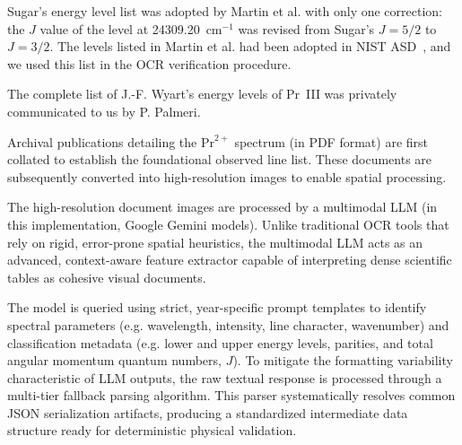 \documentclass[10pt]{article}
\begin{document}
Sugar's energy level list was adopted by Martin et al. with only one correction: the $J$ value of the level at 24309.20~cm$^{-1}$ was revised from Sugar's $J=5/2$ to $J=3/2$. The levels listed in Martin et al. had been adopted in NIST ASD~\cite{NIST_ASD}, and we used this list in the OCR verification procedure.

The complete list of J.-F. Wyart's energy levels of Pr~III was privately communicated to us by P. Palmeri.~\cite{Wyart_unpub}

Archival publications detailing the $\text{Pr}^{2+}$ spectrum (in PDF format) are first collated to establish the foundational observed line list. These documents are subsequently converted into high-resolution images to enable spatial processing.

The high-resolution document images are processed by a multimodal LLM (in this implementation, Google Gemini models). Unlike traditional OCR tools that rely on rigid, error-prone spatial heuristics, the multimodal LLM acts as an advanced, context-aware feature extractor capable of interpreting dense scientific tables as cohesive visual documents.

The model is queried using strict, year-specific prompt templates to identify spectral parameters (e.g. wavelength, intensity, line character, wavenumber) and classification metadata (e.g. lower and upper energy levels, parities, and total angular momentum quantum numbers, $J$). To mitigate the formatting variability characteristic of LLM outputs, the raw textual response is processed through a multi-tier fallback parsing algorithm. This parser systematically resolves common JSON serialization artifacts, producing a standardized intermediate data structure ready for deterministic physical validation.
\end{document}
